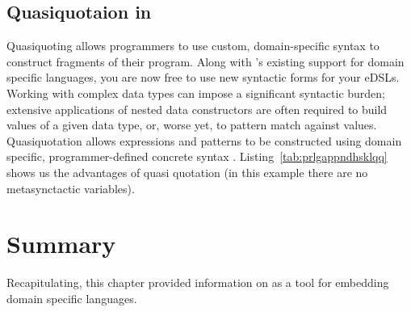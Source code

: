 \documentclass[thesis-solanki.tex]{subfiles}
\begin{document}
\subsection{Quasiquotaion in }

Quasiquoting allows programmers to use custom, domain-specific syntax to construct fragments of their program.
Along with 's existing support for domain specific languages, you are now free to use new
syntactic forms for your eDSLs.
Working with complex data types can impose a significant syntactic burden; extensive applications of nested data
constructors are often required to build values of a given data type, or, worse yet, to pattern match against
values.
Quasiquotation allows  expressions and patterns to be constructed using domain specific, programmer-defined
concrete syntax \cite{haskellquasi, mainland2007s}.
Listing~\ref{tab:prlgappndhsklqq} shows us the advantages of quasi quotation (in this example there are no
metasynctactic variables).


\section{Summary}
Recapitulating, this chapter provided information on  as a tool for embedding domain specific
languages. 


\ifMain\ifDraft
\begin{scope}
  \nolinenumbers
  \enotesize
  \par
  \begin{singlespace}
  \setlength{\parskip}{12pt plus 2pt minus 1pt}
  \theendnotes
  \par
  \end{singlespace}
\end{scope}
\fi\fi
\end{document}
